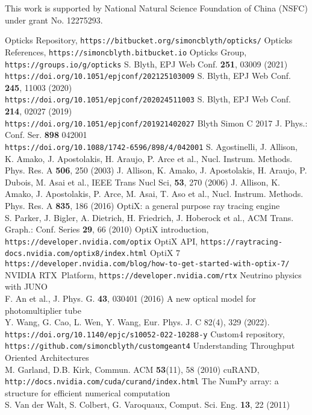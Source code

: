 \documentclass{webofc}
\begin{document}
This work is supported by National Natural Science Foundation of China (NSFC)
under grant No. 12275293.
%
\begin{thebibliography}{}
%
Opticks Repository, {\tt https://bitbucket.org/simoncblyth/opticks/}
Opticks References, {\tt https://simoncblyth.bitbucket.io}
Opticks Group, {\tt https://groups.io/g/opticks}
S. Blyth, EPJ Web Conf. {\bf 251}, 03009 (2021) \\
{\tt https://doi.org/10.1051/epjconf/202125103009}
S. Blyth, EPJ Web Conf. {\bf 245}, 11003 (2020) \\
{\tt https://doi.org/10.1051/epjconf/202024511003}
S. Blyth, EPJ Web Conf. {\bf 214}, 02027 (2019) \\
{\tt https://doi.org/10.1051/epjconf/201921402027}
Blyth Simon C 2017 J. Phys.: Conf. Ser. {\bf 898} 042001 \\
{\tt https://doi.org/10.1088/1742-6596/898/4/042001}
%
S. Agostinelli, J. Allison, K. Amako, J. Apostolakis, H. Araujo, P. Arce et al., Nucl. Instrum. Methods. Phys. Res. A {\bf 506}, 250 (2003)
J. Allison, K. Amako, J. Apostolakis, H. Araujo, P. Dubois, M. Asai et al., IEEE Trans Nucl Sci, {\bf 53}, 270 (2006)
J. Allison, K. Amako, J. Apostolakis, P. Arce, M. Asai, T. Aso et al., Nucl. Instrum. Methods. Phys. Res. A {\bf 835}, 186 (2016)
%
%
OptiX: a general purpose ray tracing engine \\
S. Parker, J. Bigler, A. Dietrich, H. Friedrich, J. Hoberock et al., ACM Trans. Graph.: Conf. Series {\bf 29}, 66 (2010)
OptiX introduction, {\tt https://developer.nvidia.com/optix}
OptiX API, {\tt https://raytracing-docs.nvidia.com/optix8/index.html}
OptiX 7 {\tt https://developer.nvidia.com/blog/how-to-get-started-with-optix-7/}
NVIDIA RTX\texttrademark\, Platform, {\tt https://developer.nvidia.com/rtx}
Neutrino physics with JUNO \\
F. An et al., J. Phys. G. {\bf 43}, 030401 (2016) 
%
A new optical model for photomultiplier tube\\
Y. Wang, G. Cao, L. Wen, Y. Wang, Eur. Phys. J. C 82(4), 329 (2022).\\
{\tt https://doi.org/10.1140/epjc/s10052-022-10288-y}
%
Custom4 repository, {\tt https://github.com/simoncblyth/customgeant4}
%
Understanding Throughput Oriented Architectures \\
M. Garland, D.B. Kirk, Commun. ACM {\bf 53}(11), 58 (2010) 
cuRAND, {\tt http://docs.nvidia.com/cuda/curand/index.html}
The NumPy array: a structure for efficient numerical computation \\
S. Van der Walt, S. Colbert, G. Varoquaux, Comput. Sci. Eng. {\bf 13}, 22 (2011)
%
\end{thebibliography}
%
\end{document}
